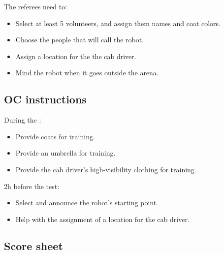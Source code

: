 The referees need to:
\begin{itemize}
	\item Select at least 5 volunteers, and assign them names and coat colors.
	\item Choose the people that will call the robot.
	\item Assign a location for the the cab driver.
	\item Mind the robot when it goes outside the arena.
\end{itemize}

\subsection*{OC instructions}

During the \SetupDays:
\begin{itemize}
	\item Provide coats for training.
	\item Provide an umbrella for training.
	\item Provide the cab driver's high-visibility clothing for training.
\end{itemize}

2h before the test:
\begin{itemize}
	\item Select and announce the robot's starting point.
	\item Help with the assignment of a location for the cab driver.
\end{itemize}

\subsection*{Score sheet}

